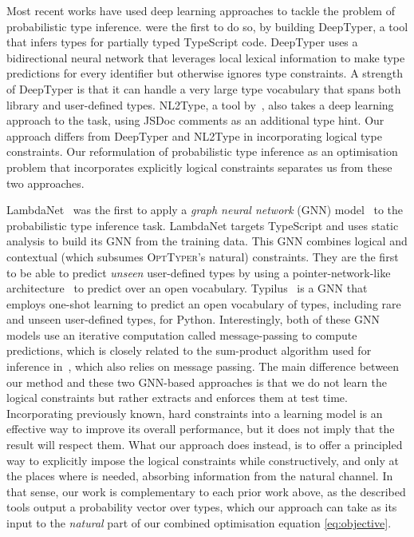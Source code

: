 \documentclass[acmsmall,nonacm]{acmart}\settopmatter{printfolios=true,printccs=false,printacmref=false}
\newcommand{\projectname}{\textsc{OptTyper}\xspace}
\begin{document}
Most recent works have used deep learning approaches to tackle
the problem of probabilistic type inference.
\citet{hellendoorn18} were the first to do so, by building 
DeepTyper, a tool that infers types for partially typed TypeScript code. DeepTyper uses a bidirectional neural network that leverages local lexical information to make type predictions for every identifier but otherwise ignores type constraints. 
A strength of DeepTyper is that it can handle a very large type vocabulary that spans both library and user-defined types.
NL2Type, a tool by~\cite{malik19}, also takes
a deep learning approach to the task, using JSDoc comments as an additional type hint.
Our approach differs from DeepTyper and NL2Type in  incorporating logical type constraints.
Our reformulation of probabilistic type inference as an optimisation problem that incorporates explicitly logical constraints separates us from these two approaches.

LambdaNet~\citep{wei20} was the first to apply a \emph{graph neural network} (GNN) model~\citep{Gilmer2017-qd,allamanis17a} to the probabilistic type inference task.
LambdaNet targets TypeScript and uses static analysis to build its GNN from the training data. 
This GNN combines logical and contextual (which subsumes \projectname's natural) constraints.
They are the first to be able to predict \emph{unseen} user-defined types by using a pointer-network-like architecture~\citep{vinyals15,Allamanis2016-su} to predict over an open vocabulary.
Typilus~\citep{allamanis20} is a GNN that employs one-shot learning to predict an open vocabulary of types, including rare and unseen user-defined types, for Python. 
Interestingly, both of these GNN models use an iterative
computation called message-passing to compute predictions,
which is closely related to the sum-product algorithm
used for inference in~\cite{xu16}, which also relies on message passing.
The main difference between our method and these two GNN-based approaches is that we do not learn the logical constraints but rather extracts and enforces them at test time.
Incorporating previously known, hard constraints into a learning
model is an effective way to improve its overall performance, but it does not imply that the result will respect them. What our approach does instead, is to offer a principled way to explicitly impose the logical constraints while constructively, 
and only at the places where is needed, absorbing information from the natural channel. In that sense, our work is complementary to each prior work above, as the described tools output
a probability vector over types, which our approach can take as its input to the
\textit{natural} part of our combined optimisation equation \eqref{eq:objective}.
\end{document}
